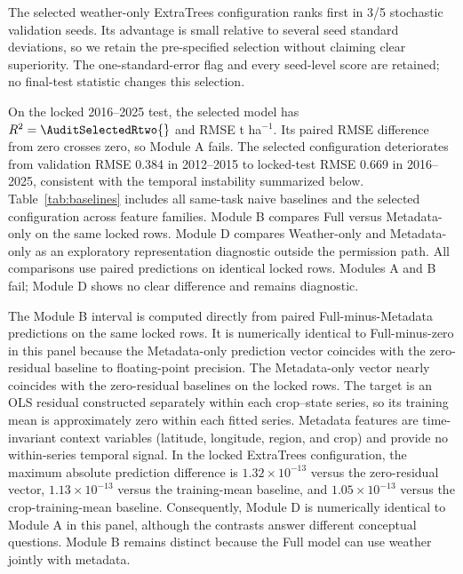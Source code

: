 \documentclass[conference]{IEEEtran}
\begin{document}
The selected weather-only ExtraTrees configuration ranks first in 3/5 stochastic
validation seeds. Its advantage is small relative to several seed standard
deviations, so we retain the pre-specified selection without claiming clear
superiority. The one-standard-error flag and every seed-level
score are retained; no final-test statistic changes this selection.

On the locked 2016--2025 test, the selected model has
$R^2=\AuditSelectedRtwo{}$ and RMSE
\AuditSelectedRMSE{} t ha$^{-1}$. Its paired RMSE difference from zero crosses
zero, so Module A fails. The selected configuration deteriorates from validation
RMSE 0.384 in 2012--2015 to locked-test RMSE 0.669 in 2016--2025, consistent with
the temporal instability summarized below. Table~\ref{tab:baselines} includes all
same-task naive baselines and the selected configuration across feature families.
Module B compares Full versus Metadata-only on the same locked rows. Module D
compares Weather-only and Metadata-only as an exploratory representation
diagnostic outside the permission path. All comparisons use paired predictions on
identical locked rows. Modules A and B fail; Module D shows no clear difference
and remains diagnostic.

The Module B interval is computed directly from paired Full-minus-Metadata
predictions on the same locked rows. It is numerically identical to
Full-minus-zero in this panel because the Metadata-only prediction vector
coincides with the zero-residual baseline to floating-point precision.
The Metadata-only vector nearly coincides with the zero-residual baselines on the
locked rows. The target is an OLS residual constructed separately within each
crop--state series, so its training mean is approximately zero within each fitted
series. Metadata features are time-invariant context variables (latitude,
longitude, region, and crop) and provide no within-series temporal signal. In the
locked ExtraTrees configuration, the maximum absolute prediction difference is
$1.32\times10^{-13}$ versus the zero-residual vector, $1.13\times10^{-13}$ versus
the training-mean baseline, and $1.05\times10^{-13}$ versus the crop-training-mean
baseline. Consequently, Module D is numerically identical to Module A in this panel,
although the contrasts answer different conceptual questions. Module B remains
distinct because the Full model can use weather jointly with metadata.

\begin{table}[t]
\centering
\caption{Locked 2016--2025 same-task audit. Learned-model predictions are seed
aggregated. $\Delta$RMSE is model minus zero-residual RMSE with paired 95\%
year-block intervals; RMSE is t ha$^{-1}$. The Module B contrast is computed
directly as Full-minus-Metadata; in this panel it matches Full-minus-zero
because Metadata-only predictions coincide with the zero-residual vector to
floating-point precision.}
\label{tab:baselines}
\scriptsize
\resizebox{\textwidth}{!}{}
\end{table}
\end{document}
